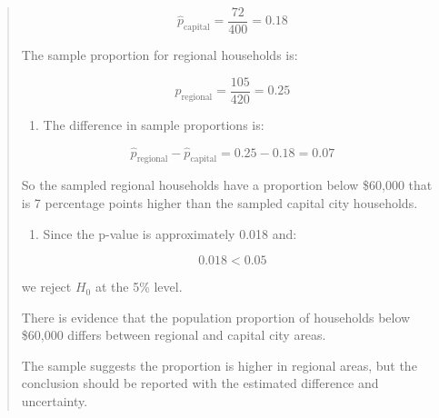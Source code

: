 \documentclass[
  letterpaper,
  DIV=11,
  numbers=noendperiod]{scrreprt}
\providecommand{\tightlist}{%
  \setlength{\itemsep}{0pt}\setlength{\parskip}{0pt}}
\begin{document}
\begin{tcolorbox}
\begin{quote}
\[
\hat{p}_{\text{capital}}
=
\frac{72}{400}
=
0.18
\]

The sample proportion for regional households is:

\[
\hat{p}_{\text{regional}}
=
\frac{105}{420}
=
0.25
\]

\begin{enumerate}
\def\labelenumi{\alph{enumi}.}
\setcounter{enumi}{1}
\tightlist
\item
  The difference in sample proportions is:
\end{enumerate}

\[
\hat{p}_{\text{regional}} - \hat{p}_{\text{capital}}
=
0.25 - 0.18
=
0.07
\]

So the sampled regional households have a proportion below \$60,000 that
is 7 percentage points higher than the sampled capital city households.

\begin{enumerate}
\def\labelenumi{\alph{enumi}.}
\setcounter{enumi}{2}
\tightlist
\item
  Since the p-value is approximately 0.018 and:
\end{enumerate}

\[
0.018 < 0.05
\]

we reject \(H_0\) at the 5\% level.

There is evidence that the population proportion of households below
\$60,000 differs between regional and capital city areas.

The sample suggests the proportion is higher in regional areas, but the
conclusion should be reported with the estimated difference and
uncertainty.
\end{quote}

\end{tcolorbox}
\end{document}
